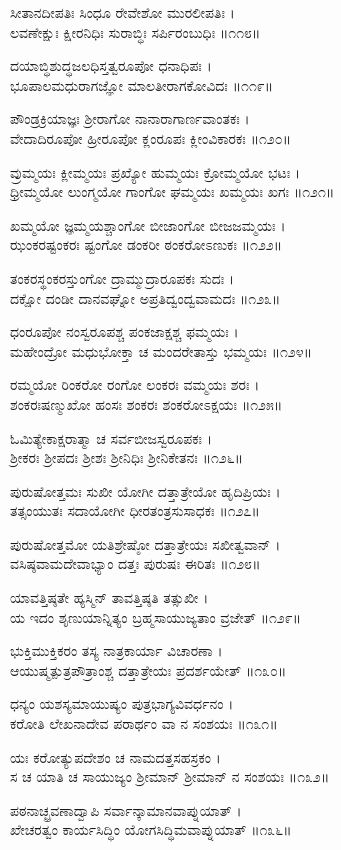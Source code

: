 ಸೀತಾನದೀಪತಿಃ ಸಿಂಧೂ ರೇವೇಶೋ ಮುರಲೀಪತಿಃ ।\\
ಲವಣೇಕ್ಷುಃ ಕ್ಷೀರನಿಧಿಃ ಸುರಾಬ್ಧಿಃ ಸರ್ಪಿರಂಬುಧಿಃ ॥೧೧೮॥

ದಯಾಬ್ಧಿಶುದ್ಧಜಲಧಿಸ್ತತ್ವರೂಪೋ ಧನಾಧಿಪಃ ।\\
ಭೂಪಾಲಮಧುರಾಗಜ್ಞೋ ಮಾಲತೀರಾಗಕೋವಿದಃ ॥೧೧೯॥

ಪೌಂಡ್ರಕ್ರಿಯಾಜ್ಞಃ ಶ್ರೀರಾಗೋ ನಾನಾರಾಗಾರ್ಣವಾಂತಕಃ ।\\
ವೇದಾದಿರೂಪೋ ಹ್ರೀರೂಪೋ ಕ್ಲಂರೂಪಃ ಕ್ಲೀಂವಿಕಾರಕಃ ॥೧೨೦॥

ವ್ರುಮ್ಮಯಃ ಕ್ಲೀಮ್ಮಯಃ ಪ್ರಖ್ಯೋ ಹುಮ್ಮಯಃ ಕ್ರೋಮ್ಮಯೋ ಭಟಃ ।\\
ಧ್ರೀಮ್ಮಯೋ ಲುಂಗ್ಮಯೋ ಗಾಂಗೋ ಘಮ್ಮಯಃ ಖಮ್ಮಯಃ ಖಗಃ ॥೧೨೧॥

ಖಮ್ಮಯೋ ಜ್ಞಮ್ಮಯಶ್ಚಾಂಗೋ ಬೀಜಾಂಗೋ ಬೀಜಜಮ್ಮಯಃ ।\\
ಝಂಕರಷ್ಟಂಕರಃ ಷ್ಟಂಗೋ ಡಂಕರೀ ಠಂಕರೋಽಣುಕಃ ॥೧೨೨॥

ತಂಕರಸ್ಥಂಕರಸ್ತುಂಗೋ ದ್ರಾಮ್ಮುದ್ರಾರೂಪಕಃ ಸುದಃ ।\\
ದಕ್ಷೋ ದಂಡೀ ದಾನವಘ್ನೋ ಅಪ್ರತಿದ್ವಂದ್ವವಾಮದಃ ॥೧೨೩॥

ಧಂರೂಪೋ ನಂಸ್ವರೂಪಶ್ಚ ಪಂಕಜಾಕ್ಷಶ್ಚ ಫಮ್ಮಯಃ ।\\
ಮಹೇಂದ್ರೋ ಮಧುಭೋಕ್ತಾ ಚ ಮಂದರೇತಾಸ್ತು ಭಮ್ಮಯಃ ॥೧೨೪॥

ರಮ್ಮಯೋ ರಿಂಕರೋ ರಂಗೋ ಲಂಕರಃ ವಮ್ಮಯಃ ಶರಃ ।\\
ಶಂಕರಃಷಣ್ಮುಖೋ ಹಂಸಃ ಶಂಕರಃ ಶಂಕರೋಽಕ್ಷಯಃ ॥೧೨೫॥

ಓಮಿತ್ಯೇಕಾಕ್ಷರಾತ್ಮಾ ಚ ಸರ್ವಬೀಜಸ್ವರೂಪಕಃ ।\\
ಶ್ರೀಕರಃ ಶ್ರೀಪದಃ ಶ್ರೀಶಃ ಶ್ರೀನಿಧಿಃ ಶ್ರೀನಿಕೇತನಃ ॥೧೨೬॥

ಪುರುಷೋತ್ತಮಃ ಸುಖೀ ಯೋಗೀ ದತ್ತಾತ್ರೇಯೋ ಹೃದಿಪ್ರಿಯಃ ।\\
ತತ್ಸಂಯುತಃ ಸದಾಯೋಗೀ ಧೀರತಂತ್ರಸುಸಾಧಕಃ ॥೧೨೭॥

ಪುರುಷೋತ್ತಮೋ ಯತಿಶ್ರೇಷ್ಠೋ ದತ್ತಾತ್ರೇಯಃ ಸಖೀತ್ವವಾನ್ ।\\
ವಸಿಷ್ಠವಾಮದೇವಾಭ್ಯಾಂ ದತ್ತಃ ಪುರುಷಃ ಈರಿತಃ ॥೧೨೮॥

ಯಾವತ್ತಿಷ್ಠತೇ ಹ್ಯಸ್ಮಿನ್ ತಾವತ್ತಿಷ್ಠತಿ ತತ್ಸುಖೀ ।\\
ಯ ಇದಂ ಶೃಣುಯಾನ್ನಿತ್ಯಂ ಬ್ರಹ್ಮಸಾಯುಜ್ಯತಾಂ ವ್ರಜೇತ್ ॥೧೨೯॥

ಭುಕ್ತಿಮುಕ್ತಿಕರಂ ತಸ್ಯ ನಾತ್ರಕಾರ್ಯಾ ವಿಚಾರಣಾ ।\\
ಆಯುಷ್ಮತ್ಪುತ್ರಪೌತ್ರಾಂಶ್ಚ ದತ್ತಾತ್ರೇಯಃ ಪ್ರದರ್ಶಯೇತ್ ॥೧೩೦॥

ಧನ್ಯಂ ಯಶಸ್ಯಮಾಯುಷ್ಯಂ ಪುತ್ರಭಾಗ್ಯವಿವರ್ಧನಂ ।\\
ಕರೋತಿ ಲೇಖನಾದೇವ ಪರಾರ್ಥಂ ವಾ ನ ಸಂಶಯಃ ॥೧೩೧॥

ಯಃ ಕರೋತ್ಯುಪದೇಶಂ ಚ ನಾಮದತ್ತಸಹಸ್ರಕಂ ।\\
ಸ ಚ ಯಾತಿ ಚ ಸಾಯುಜ್ಯಂ ಶ್ರೀಮಾನ್ ಶ್ರೀಮಾನ್ ನ ಸಂಶಯಃ ॥೧೩೨॥

ಪಠನಾಚ್ಛ್ರವಣಾದ್ವಾಪಿ ಸರ್ವಾನ್ಕಾಮಾನವಾಪ್ನುಯಾತ್ ।\\
ಖೇಚರತ್ವಂ ಕಾರ್ಯಸಿದ್ಧಿಂ ಯೋಗಸಿದ್ಧಿಮವಾಪ್ನುಯಾತ್ ॥೧೩೬॥

